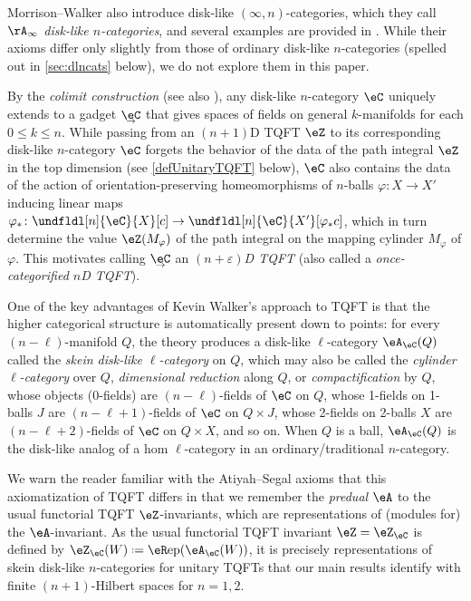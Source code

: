 \documentclass[12pt,reqno]{amsart}
\newcommand{\eRep}{{\eR}\mathrm{ep}}
\newcommand{\A}{\eA}
\newcommand{\C}{\eC}
\newcommand{\Z}{\eZ}
\newcommand{\e}{\varepsilon}
\newcommand{\defn}[1]{\emph{#1}}
\DeclareRobustCommand{\coloneq}{\mathrel{\vcenter{\baselineskip0.5ex\lineskiplimit0pt\hbox{\scriptsize{\upshape.}}\hbox{\scriptsize{\upshape.}}}}=}
\newcommand{\undCtemp}{\bgroup\smash[b]{\text{$\underset{\smash{\raisebox{.225em}{$\scriptstyle\kern.05ex\rightarrow$}}}{\smash{\C}}$}}\egroup}
\newcommand{\undC}{\vphantom{\C}{\undCtemp}}
\begin{document}
Morrison--Walker also introduce disk-like $(\infty,n)$-categories, which they call \defn{$\rA_\infty$ disk-like $n$-categories}, and several examples are provided in \cite[\S6.2]{MW12}. While their axioms differ only slightly from those of ordinary disk-like $n$-categories (spelled out in \cref{sec:dlncats} below), we do not explore them in this paper.

By the \defn{colimit construction} \cite[\S6.3]{MW12} (see also \cite{morrison2011higher}), any disk-like $n$-category $\C$ uniquely extends to a gadget $\undC$ that gives spaces of fields on general $k$-manifolds for each $0\leq k\leq n$. While passing from an $(n+1)$D TQFT $\Z$ to its corresponding disk-like $n$-category $\C$ forgets the behavior of the data of the path integral $\Z$ in the top dimension (see \cref{defUnitaryTQFT} below), $\C$ also contains the data of the action of orientation-preserving homeomorphisms of $n$-balls $\varphi\colon X\to X'$ inducing linear maps $\varphi_*\colon\undfldl[n]{\C}{X}[c]\to\undfldl[n]{\C}{X'}[\varphi_* c]$, which in turn determine the value $\Z(M_\varphi)$ of the path integral on the mapping cylinder $M_\varphi$ of $\varphi$. This motivates calling $\undC$ an \defn{$(n+\e)$D TQFT} (also called a \defn{once-categorified $n$D TQFT}). 

One of the key advantages of Kevin Walker's approach to TQFT is that the higher categorical structure is automatically present down to points: for every $(n-\ell)$-manifold $Q$, the theory produces a disk-like $\ell$-category $\A_\C(Q)$ called the \defn{skein disk-like $\ell$-category} on $Q$, which may also be called the \defn{cylinder $\ell$-category} over $Q$, \defn{dimensional reduction} along $Q$, or \defn{compactification} by $Q$, whose objects (0-fields) are $(n-\ell)$-fields of $\C$ on $Q$, whose 1-fields on 1-balls $J$ are $(n-\ell+1)$-fields of $\C$ on $Q\times J$, whose 2-fields on 2-balls $X$ are $(n-\ell+2)$-fields of $\C$ on $Q\times X$, and so on. When $Q$ is a ball, $\A_\C(Q)$ is the disk-like analog of a hom $\ell$-category in an ordinary/traditional $n$-category. 

We warn the reader familiar with the Atiyah--Segal axioms \cite{Ati88,Seg04} that this axiomatization of TQFT differs in that we remember the \emph{predual} $\A$ to the usual functorial TQFT $\Z$-invariants, which are representations of (modules for) the $\A$-invariant. As the usual functorial TQFT invariant $\Z=\Z_\C$ is defined by $\Z_\C(W)\coloneq\eRep(\A_\C(W))$, it is precisely representations of skein disk-like $n$-categories for unitary TQFTs that our main results identify with finite $(n+1)$-Hilbert spaces for $n=1,2$. 
\end{document}
